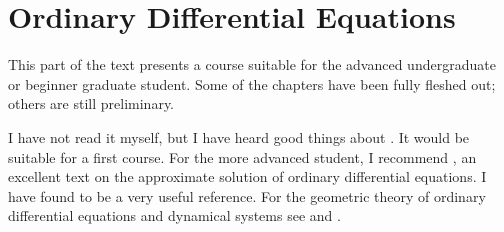 \part{Ordinary Differential Equations}

This part of the text presents a course suitable for the advanced undergraduate
or beginner graduate student.  Some of the chapters have been fully fleshed
out; others are still preliminary.

I have not read it myself, but I have heard
good things about \cite{boyce:2002}.  It would be suitable for a first course.
For the more advanced student, I recommend \cite{bender:1978}, an
excellent text on the approximate solution of ordinary differential equations.
I have found \cite{zwillinger:1992} to be a very useful reference.  
For the geometric theory of ordinary differential equations and dynamical 
systems see \cite{arnold:1973} and \cite{hirsch:1974}.













































